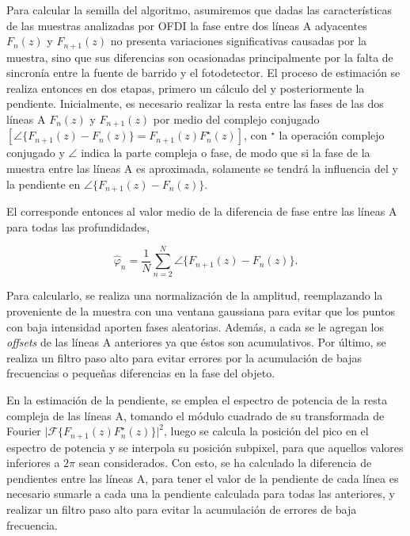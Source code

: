 Para calcular la semilla del algoritmo, asumiremos que dadas las características de las muestras analizadas por OFDI la fase entre dos líneas A adyacentes $F_n(z)$ y $F_{n+1}(z)$ no presenta variaciones significativas causadas por la muestra, sino que sus diferencias son ocasionadas principalmente por la falta de sincronía entre la fuente de barrido y el fotodetector. El proceso de estimación se realiza entonces en dos etapas, primero un cálculo del \offset y posteriormente la pendiente. Inicialmente, es necesario realizar la resta entre las fases de las dos líneas A $F_n(z)$ y $F_{n+1}(z)$ por medio del complejo conjugado $[\angle \{F_{n+1}(z)-F_n(z)\} = F_{n+1}(z)F_n^{\star}(z)]$, con $^\star$ la operación complejo conjugado y $\angle$ indica la parte compleja o fase, de modo que si la fase de la muestra entre las líneas A es aproximada, solamente se tendrá la influencia del \offset y la pendiente en $\angle \{F_{n+1}(z)-F_n(z)\}$.

El \offset corresponde entonces al valor medio de la diferencia de fase entre las líneas A para todas las profundidades, 

\begin{equation}
\hat{\varphi}_n = \frac{1}{N}\sum_{n=2}^{N}\angle\{ F_{n+1}(z)-F_n(z)\}.
\end{equation}

\noindent Para calcularlo, se realiza una normalización de la amplitud, reemplazando la proveniente de la muestra con una ventana gaussiana para evitar que los puntos con baja intensidad aporten fases aleatorias. Además, a cada \offset se le agregan los \textit{offsets} de las líneas A anteriores ya que éstos son acumulativos. Por último, se realiza un filtro paso alto para evitar errores por la acumulación de bajas frecuencias o pequeñas diferencias en la fase del objeto. 

En la estimación de la pendiente, se emplea el espectro de potencia de la resta compleja de las líneas A, tomando el módulo cuadrado de su transformada de Fourier $\lvert \mathscr{F}\{F_{n+1}(z)F_n^{\star}(z) \}\rvert^2$, luego se calcula la posición del pico en el espectro de potencia y se interpola su posición subpixel, para que aquellos valores inferiores a $2\pi$ sean considerados. Con esto, se ha calculado la diferencia de pendientes entre las líneas A, para tener el valor de la pendiente de cada línea es necesario sumarle a cada una la pendiente calculada para todas las anteriores, y realizar un filtro paso alto para evitar la acumulación de errores de baja frecuencia.

